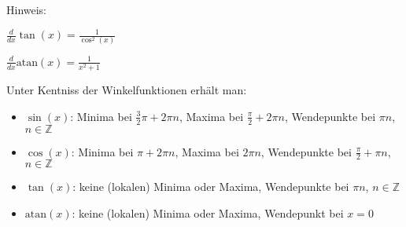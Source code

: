 \item

Hinweis: 

$\frac{d}{dx}\tan(x) = \frac{1}{\cos^2(x)}$

$\frac{d}{dx}\text{atan}(x) = \frac{1}{x^2+1}$

Unter Kentniss der Winkelfunktionen erhält man:

\begin{itemize}
\item $\sin(x)$: Minima bei $\frac{3}{2}\pi+2\pi{n}$, Maxima bei $\frac{\pi}{2}+2\pi{n}$, Wendepunkte bei $\pi{n}$, $n \in \mathbb{Z}$
\item $\cos(x)$: Minima bei $\pi+2\pi{n}$, Maxima bei $2\pi{n}$, Wendepunkte bei $\frac{\pi}{2}+\pi{n}$, $n \in \mathbb{Z}$
\item $\tan(x)$: keine (lokalen) Minima oder Maxima, Wendepunkte bei $\pi{n}$, $n \in \mathbb{Z}$
\item $\text{atan}(x)$: keine (lokalen) Minima oder Maxima, Wendepunkt bei $x=0$
\end{itemize}

